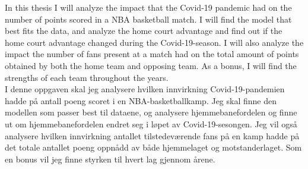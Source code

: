 
In this thesis I will analyze the impact that the Covid-19 pandemic had on the number of points scored in a NBA basketball match. I will find the model that best fits the data, and analyze the home court advantage and find out if the home court advantage changed during the Covid-19-season. I will also analyze the impact the number of fans present at a match had on the total amount of points obtained by both the home team and opposing team. As a bonus, I will find the strengths of each team throughout the years. \\

I denne oppgaven skal jeg analysere hvilken innvirkning Covid-19-pandemien hadde på antall poeng scoret i en NBA-basketballkamp. Jeg skal finne den modellen som passer best til dataene, og analysere hjemmebanefordelen og finne ut om hjemmebanefordelen endret seg i løpet av Covid-19-sesongen. Jeg vil også analysere hvilken innvirkning antallet tilstedeværende fans på en kamp hadde på det totale antallet poeng oppnådd av både hjemmelaget og motstanderlaget. Som en bonus vil jeg finne styrken til hvert lag gjennom årene.
